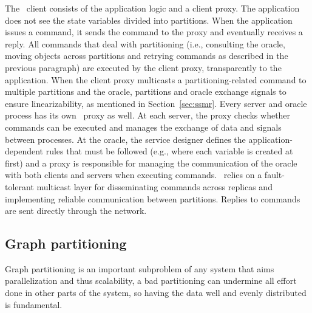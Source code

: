 The \dssmr\ client consists of the application logic and a client proxy.
The application does not see the state variables divided into partitions.
When the application issues a command, it sends the command to the proxy and eventually receives a reply.
All commands that deal with partitioning (i.e., consulting the oracle, moving objects across partitions and retrying commands as described in the previous paragraph) are executed by the client proxy, transparently to the application.
When the client proxy multicasts a partitioning-related command to multiple partitions and the oracle, partitions and oracle exchange signals to ensure linearizability, as mentioned in Section~\ref{sec:ssmr}.
Every server and oracle process has its own \dssmr\ proxy as well.
At each server, the proxy checks whether commands can be executed and manages the exchange of data and signals between processes.
At the oracle, the service designer defines the application-dependent rules that must be followed (e.g., where each variable is created at first) and a proxy is responsible for managing the communication of the oracle with both clients and servers when executing commands.
\dssmr\ relies on a fault-tolerant multicast layer for disseminating commands across replicas and implementing reliable communication between partitions.
Replies to commands are sent directly through the network.



\subsection{Graph partitioning}
Graph partitioning is an important subproblem of any system that aims parallelization and thus scalability, a bad partitioning can undermine all effort done in other parts of the system, so having the data well and evenly distributed is fundamental.

